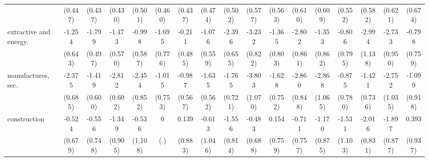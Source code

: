 {\begin{tabular}{l*{16}{c}}
                    &     (0.447)         &     (0.437)         &     (0.430)         &     (0.501)         &     (0.460)         &     (0.437)         &     (0.474)         &     (0.502)         &     (0.577)         &     (0.563)         &     (0.610)         &     (0.609)         &     (0.552)         &     (0.582)         &     (0.621)         &     (0.674)         \\
[1em]
extractive and energy.&      -1.254         &      -1.799\sym{***}&      -1.473\sym{**} &      -0.998         &      -1.695\sym{*}  &      -0.211         &      -1.076         &      -2.396\sym{***}&      -3.232\sym{***}&      -1.365         &      -2.802\sym{**} &      -1.353         &      -0.806         &      -2.994\sym{**} &      -2.733\sym{**} &      -0.798         \\
                    &     (0.643)         &     (0.497)         &     (0.570)         &     (0.587)         &     (0.776)         &     (0.485)         &     (0.559)         &     (0.655)         &     (0.822)         &     (0.803)         &     (0.861)         &     (0.862)         &     (0.795)         &     (1.138)         &     (0.950)         &     (0.759)         \\
[1em]
manufactures, sec.  &      -2.375\sym{***}&      -1.419\sym{*}  &      -2.812\sym{***}&      -2.454\sym{**} &      -1.015         &      -0.987         &      -1.635\sym{**} &      -1.765\sym{*}  &      -3.803\sym{***}&      -1.628\sym{*}  &      -2.860\sym{***}&      -2.868\sym{**} &      -0.875         &      -1.421         &      -2.752\sym{**} &      -1.099         \\
                    &     (0.685)         &     (0.600)         &     (0.602)         &     (0.852)         &     (0.753)         &     (0.567)         &     (0.562)         &     (0.721)         &     (1.070)         &     (0.752)         &     (0.848)         &     (1.065)         &     (0.780)         &     (0.736)         &     (1.035)         &     (0.918)         \\
[1em]
construction        &      -0.524         &      -0.556         &      -1.349         &      -0.536         &           0         &       0.139         &      -0.613         &      -1.556         &      -0.483         &       0.154         &      -0.711         &      -1.170         &      -1.531         &      -2.016\sym{*}  &      -1.897\sym{*}  &       0.393         \\
                    &     (0.679)         &     (0.748)         &     (0.905)         &     (1.108)         &         (.)         &     (0.883)         &     (1.046)         &     (0.814)         &     (0.688)         &     (0.759)         &     (0.757)         &     (0.875)         &     (1.103)         &     (0.831)         &     (0.877)         &     (0.937)         \\

\end{tabular}}
